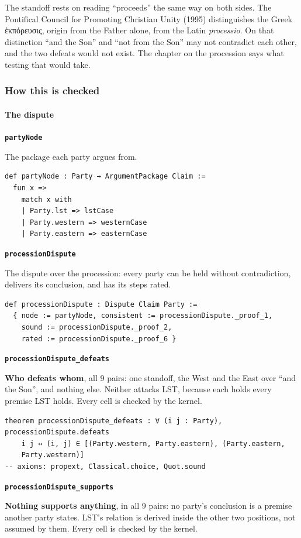 \documentclass[11pt,paper=\testimonypaper,DIV=13,parskip=false]{scrartcl}
\begin{document}
The standoff rests on reading “proceeds” the same way on both sides. The Pontifical Council for Promoting Christian Unity (1995) distinguishes the Greek ἐκπόρευσις, origin from the Father alone, from the Latin \emph{processio}. On that distinction “and the Son” and “not from the Son” may not contradict each other, and the two defeats would not exist. The chapter on the procession says what testing that would take.

\subsubsection*{How this is checked}
\paragraph*{The dispute}
\leavevmode\par\nobreak
\par\medskip\noindent\textbf{\texttt{party\allowbreak{}Node}}\par\nobreak\noindent
The package each party argues from.

{\small\begin{verbatim}
def partyNode : Party → ArgumentPackage Claim :=
  fun x =>
    match x with
    | Party.lst => lstCase
    | Party.western => westernCase
    | Party.eastern => easternCase
\end{verbatim}}
\par\medskip\noindent\textbf{\texttt{procession\allowbreak{}Dispute}}\par\nobreak\noindent
The dispute over the procession: every party can be held without contradiction, delivers its conclusion, and has its steps rated.

{\small\begin{verbatim}
def processionDispute : Dispute Claim Party :=
  { node := partyNode, consistent := processionDispute._proof_1,
    sound := processionDispute._proof_2,
    rated := processionDispute._proof_6 }
\end{verbatim}}
\par\medskip\noindent\textbf{\texttt{procession\allowbreak{}Dispute\_\allowbreak{}defeats}}\par\nobreak\noindent
\textbf{Who defeats whom}, all 9 pairs: one standoff, the West and the East over “and the Son”, and nothing else. Neither attacks LST, because each holds every premise LST holds. Every cell is checked by the kernel.

{\small\begin{verbatim}
theorem processionDispute_defeats : ∀ (i j : Party), processionDispute.defeats
    i j ↔ (i, j) ∈ [(Party.western, Party.eastern), (Party.eastern,
    Party.western)]
-- axioms: propext, Classical.choice, Quot.sound
\end{verbatim}}
\par\medskip\noindent\textbf{\texttt{procession\allowbreak{}Dispute\_\allowbreak{}supports}}\par\nobreak\noindent
\textbf{Nothing supports anything}, in all 9 pairs: no party’s conclusion is a premise another party states. LST’s relation is derived inside the other two positions, not assumed by them. Every cell is checked by the kernel.
\end{document}
